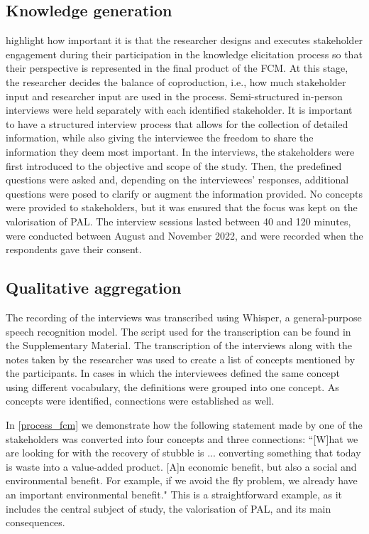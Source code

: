 \subsection{Knowledge generation}

\cite{edwards2021building} highlight how important it is that the researcher designs and executes stakeholder engagement during their participation in the knowledge elicitation process so that their perspective is represented in the final product of the FCM. At this stage, the researcher decides the balance of coproduction, i.e., how much stakeholder input and researcher input are used in the process. Semi-structured in-person interviews were held separately with each identified stakeholder. It is important to have a structured interview process that allows for the collection of detailed information, while also giving the interviewee the freedom to share the information they deem most important. In the interviews, the stakeholders were first introduced to the objective and scope of the study. Then, the predefined questions were asked and, depending on the interviewees' responses, additional questions were posed to clarify or augment the information provided. No concepts were provided to stakeholders, but it was ensured that the focus was kept on the valorisation of PAL. The interview sessions lasted between 40 and 120 minutes, were conducted between August and November 2022, and were recorded when the respondents gave their consent. 

\subsection{Qualitative aggregation}

The recording of the interviews was transcribed using Whisper, a general-purpose speech recognition model. The script used for the transcription can be found in the Supplementary Material. The transcription of the interviews along with the notes taken by the researcher was used to create a list of concepts mentioned by the participants. In cases in which the interviewees defined the same concept using different vocabulary, the definitions were grouped into one concept. As concepts were identified, connections were established as well. 

In \cref{process_fcm} we demonstrate how the following statement made by one of the stakeholders was converted into four concepts and three connections: ``[W]hat we are looking for with the recovery of stubble is ... converting something that today is waste into a value-added product. [A]n economic benefit, but also a social and environmental benefit. For example, if we avoid the fly problem, we already have an important environmental benefit." This is a straightforward example, as it includes the central subject of study, the valorisation of PAL, and its main consequences. 

